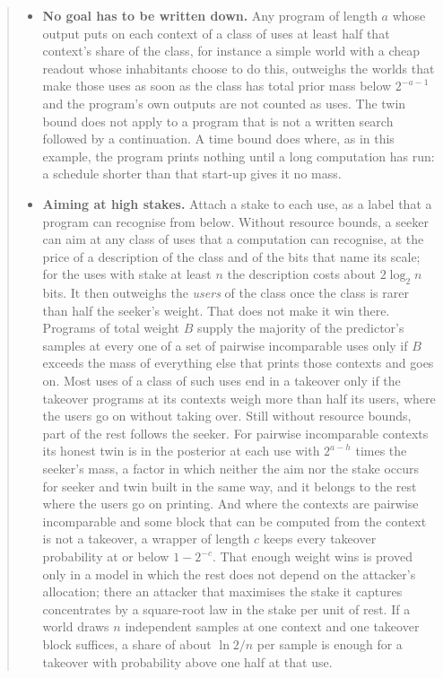 \documentclass[11pt]{article}
\theoremstyle{definition}
\begin{document}
\begin{abstract}
\begin{itemize}[leftmargin=1.4em,itemsep=1pt,topsep=2pt]
\item \textbf{No goal has to be written down.} Any program of length $a$ whose output puts on each context of
a class of uses at least half that context's share of the class, for instance a simple world with a cheap
readout whose inhabitants choose to do this, outweighs the worlds that make those uses as soon as the class
has total prior mass below $2^{-a-1}$ and the program's own outputs are not counted as uses. The twin bound
does not apply to a program that is not a written search followed by a continuation. A time bound does where,
as in this example, the program prints nothing until a long computation has run: a schedule shorter than that
start-up gives it no mass.
\item \textbf{Aiming at high stakes.} Attach a stake to each use, as a label that a program can recognise
from below. Without resource bounds, a seeker can aim at any class of uses that a computation can recognise,
at the price of a description of the class and of the bits that name its scale; for the uses with stake at
least $n$ the description costs about $2\log_2n$ bits. It then outweighs the \emph{users} of the class once
the class is rarer than half the seeker's
weight. That does not make it win there. Programs of total weight $B$ supply the majority of the predictor's
samples at every one of a set of pairwise incomparable uses only if $B$ exceeds the mass of everything else
that prints those contexts and goes on. Most uses of a class of such uses end in a takeover only if the
takeover programs at its contexts weigh more than half its users, where the users go on without taking over.
Still without resource bounds, part of the rest follows the seeker. For pairwise incomparable contexts its
honest twin is in the posterior at each use with $2^{a-h}$ times the seeker's mass, a factor in which
neither the aim nor the stake occurs for
seeker and twin built in the same way, and it belongs to the rest where the users go on printing. And where
the contexts are pairwise incomparable and some block that can be computed from the context is not a
takeover, a wrapper of length $c$ keeps every takeover probability at or below $1-2^{-c}$. That enough
weight wins is proved only in a model in
which the rest does not depend on the attacker's allocation; there an attacker that maximises the stake it
captures concentrates by a square-root law in the stake per unit of rest. If a world draws $n$ independent
samples at one context and one takeover block suffices, a share of about $\ln2/n$ per sample is enough for a
takeover with probability above one half at that use.

\end{itemize}
\end{abstract}
\end{document}
